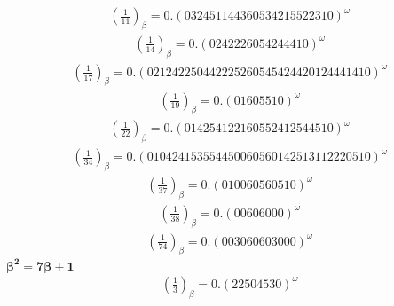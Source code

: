 \documentclass[fleqn]{article}
\begin{document}
\begin{equation*}
\begin{split}
(\frac{1}{11})_\beta = 0.(032451144360534215522310)^\omega
\end{split}\end{equation*}
\begin{equation*}
\begin{split}
(\frac{1}{14})_\beta = 0.(0242226054244410)^\omega
\end{split}\end{equation*}
\begin{equation*}
\begin{split}
(\frac{1}{17})_\beta = 0.(021242250442225260545424420124441410)^\omega
\end{split}\end{equation*}
\begin{equation*}
\begin{split}
(\frac{1}{19})_\beta = 0.(01605510)^\omega
\end{split}\end{equation*}
\begin{equation*}
\begin{split}
(\frac{1}{22})_\beta = 0.(014254122160552412544510)^\omega
\end{split}\end{equation*}
\begin{equation*}
\begin{split}
(\frac{1}{34})_\beta = 0.(010424153554450060560142513112220510)^\omega
\end{split}\end{equation*}
\begin{equation*}
\begin{split}
(\frac{1}{37})_\beta = 0.(010060560510)^\omega
\end{split}\end{equation*}
\begin{equation*}
\begin{split}
(\frac{1}{38})_\beta = 0.(00606000)^\omega
\end{split}\end{equation*}
\begin{equation*}
\begin{split}
(\frac{1}{74})_\beta = 0.(003060603000)^\omega
\end{split}\end{equation*}
$\boldsymbol{\beta^2 = 7\beta + 1}$
\begin{equation*}
\begin{split}
(\frac{1}{3})_\beta = 0.(22504530)^\omega
\end{split}\end{equation*}
\end{document}
